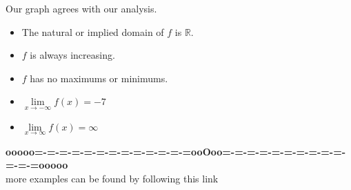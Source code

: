 \documentclass{ximera}
\begin{document}
\begin{example}
\begin{explanation}
Our graph agrees with our analysis.

\begin{itemize}
\item The natural or implied domain of $f$ is $\mathbb{R}$.
\item $f$ is always increasing.
\item $f$ has no maximums or minimums.
\item $\lim\limits_{x \to -\infty} f(x) = -7$
\item $\lim\limits_{x \to \infty} f(x) = \infty$
\end{itemize}




\end{explanation}

\end{example}























\begin{center}
\textbf{\textcolor{green!50!black}{ooooo=-=-=-=-=-=-=-=-=-=-=-=-=ooOoo=-=-=-=-=-=-=-=-=-=-=-=-=ooooo}} \\

more examples can be found by following this link\\ 

\end{center}
\end{document}
